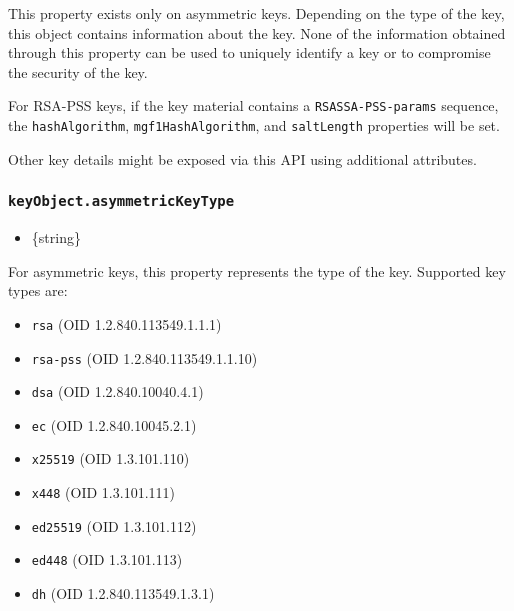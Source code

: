 This property exists only on asymmetric keys. Depending on the type of
the key, this object contains information about the key. None of the
information obtained through this property can be used to uniquely
identify a key or to compromise the security of the key.

For RSA-PSS keys, if the key material contains a
\texttt{RSASSA-PSS-params} sequence, the \texttt{hashAlgorithm},
\texttt{mgf1HashAlgorithm}, and \texttt{saltLength} properties will be
set.

Other key details might be exposed via this API using additional
attributes.

\subsubsection{\texorpdfstring{\texttt{keyObject.asymmetricKeyType}}{keyObject.asymmetricKeyType}}\label{keyobject.asymmetrickeytype}

\begin{itemize}
\tightlist
\item
  \{string\}
\end{itemize}

For asymmetric keys, this property represents the type of the key.
Supported key types are:

\begin{itemize}
\tightlist
\item
  \texttt{\textquotesingle{}rsa\textquotesingle{}} (OID
  1.2.840.113549.1.1.1)
\item
  \texttt{\textquotesingle{}rsa-pss\textquotesingle{}} (OID
  1.2.840.113549.1.1.10)
\item
  \texttt{\textquotesingle{}dsa\textquotesingle{}} (OID
  1.2.840.10040.4.1)
\item
  \texttt{\textquotesingle{}ec\textquotesingle{}} (OID
  1.2.840.10045.2.1)
\item
  \texttt{\textquotesingle{}x25519\textquotesingle{}} (OID 1.3.101.110)
\item
  \texttt{\textquotesingle{}x448\textquotesingle{}} (OID 1.3.101.111)
\item
  \texttt{\textquotesingle{}ed25519\textquotesingle{}} (OID 1.3.101.112)
\item
  \texttt{\textquotesingle{}ed448\textquotesingle{}} (OID 1.3.101.113)
\item
  \texttt{\textquotesingle{}dh\textquotesingle{}} (OID
  1.2.840.113549.1.3.1)
\end{itemize}

